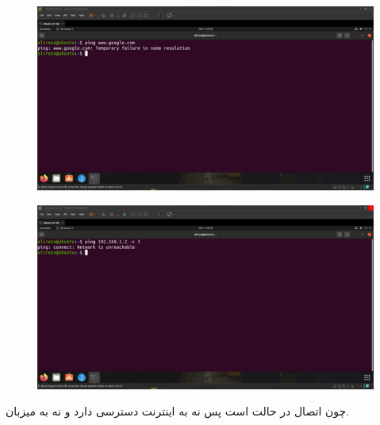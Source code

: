\documentclass{article}
\begin{document}
\subsection{}
\begin{figure}[H]
    \centering
    \includegraphics[width=1.0\textwidth]{figures/9a.jpg}
    \caption
	{
	}
    \label{fig:fig1}
\end{figure}

\begin{figure}[H]
    \centering
    \includegraphics[width=1.0\textwidth]{figures/9b.jpg}
    \caption
	{
	}
    \label{fig:fig1}
\end{figure}
چون اتصال در حالت  است پس نه به اینترنت دسترسی دارد و نه به میزبان.


\end{document}
